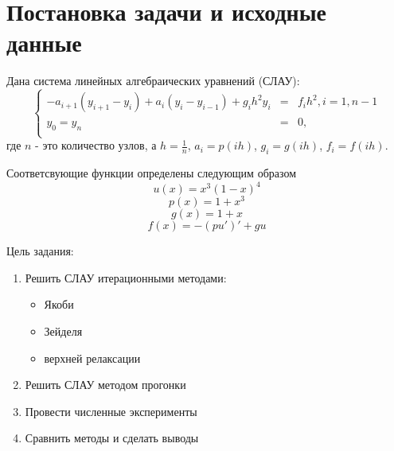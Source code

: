 \section{Постановка задачи и исходные данные}
Дана система линейных алгебраических уравнений (СЛАУ):
\begin{equation}\label{eq:syst}
	\left\{
	\begin{array}{rcl}
		-a_{i+1}(y_{i+1} - y_i) + a_i(y_i - y_{i-1}) + g_i h^2 y_i&=&f_i h^2, i = 1, n-1\\
		y_0 = y_n&=&0,\\
	\end{array}
	\right.
\end{equation}
где $n$ - это количество узлов, а $h = \frac{1}{n}$, $a_i = p(ih)$, $g_i = g(ih)$, $f_i = f(ih)$.

Соответсвующие функции определены следующим образом
\begin{equation}\label{ux}
	u(x) = x^3(1-x)^4
\end{equation}
\begin{equation}\label{px}
	p(x) = 1+x^3
\end{equation}
\begin{equation}\label{gx}
	g(x) = 1+x
\end{equation}
\begin{equation}\label{fx}
	f(x) = -(pu')'+gu
\end{equation}

Цель задания:
\begin{enumerate}
	\item Решить СЛАУ итерационными методами:
		\begin{itemize}
			\item Якоби
			\item Зейделя
			\item верхней релаксации
		\end{itemize}
	\item Решить СЛАУ методом прогонки
	\item Провести численные эксперименты
	\item Сравнить методы и сделать выводы
\end{enumerate}

